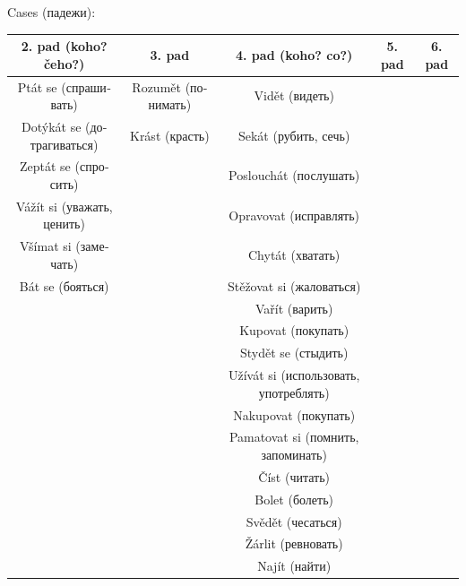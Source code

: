 \documentclass[12pt]{book}
\begin{document}
Cases (\textrussian{падежи}):
\begin{center}
\begin{tabular}{|c|c|c|c|c|}
    \hline
    2. pad (koho? čeho?) & 3. pad & 4. pad (koho? co?) & 5. pad & 6. pad \\
    \hline
    Ptát se (\textrussian{спрашивать}) & Rozumět (\textrussian{понимать}) & Vidět (\textrussian{видеть}) & & \\
    \hline
    Dotýkát se (\textrussian{дотрагиваться}) & Krást (\textrussian{красть}) & Sekát (\textrussian{рубить, сечь}) & & \\
    \hline
    Zeptát se (\textrussian{спросить}) & & Poslouchát (\textrussian{послушать}) & & \\
    \hline
    Vážít si (\textrussian{уважать, ценить}) & & Opravovat (\textrussian{исправлять}) & & \\
    \hline
    Všímat si (\textrussian{замечать}) & & Chytát (\textrussian{хватать}) & & \\
    \hline
    Bát se (\textrussian{бояться}) & & Stěžovat si (\textrussian{жаловаться}) & & \\
    \hline
    & & Vařít (\textrussian{варить}) & & \\
    \hline
    & & Kupovat (\textrussian{покупать}) & & \\
    \hline
    & & Stydět se (\textrussian{стыдить}) & & \\
    \hline
    & & Užívát si (\textrussian{использовать, употреблять}) & & \\
    \hline
    & & Nakupovat (\textrussian{покупать}) & & \\
    \hline
    & & Pamatovat si (\textrussian{помнить, запоминать}) & & \\
    \hline
    & & Číst (\textrussian{читать}) & & \\
    \hline
    & & Bolet (\textrussian{болеть}) & & \\
    \hline
    & & Svědět (\textrussian{чесаться}) & & \\
    \hline
    & & Žárlit (\textrussian{ревновать}) & & \\
    \hline
    & & Najít (\textrussian{найти}) & & \\
    \hline
\end{tabular}
\end{center}
\end{document}
